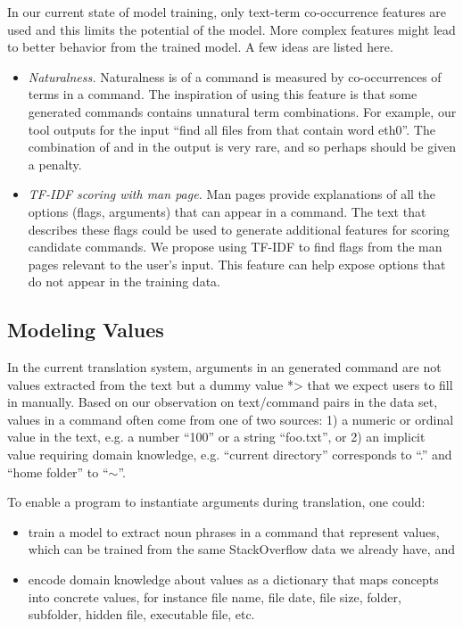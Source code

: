 In our current state of model training, only text-term co-occurrence features are used and this limits the potential of the model. More complex features might lead to better behavior from the trained model. A few ideas are listed here.
\begin{itemize}\itemsep-1pt
\item \textit{Naturalness.} Naturalness is of a command is measured by co-occurrences of terms in a command. The inspiration of using this feature is that some generated commands contains unnatural term combinations. For example, our tool outputs  for the input ``find all files from that contain word eth0''. The combination of  and  in the output is very rare, and so perhaps should be given a penalty.
\item \textit{TF-IDF scoring with man page.} Man pages provide explanations of all the options (flags, arguments) that can appear in a command. The text that describes these flags could be used to generate additional features for scoring candidate commands. We propose using TF-IDF to find flags from the man pages relevant to the user's input. This feature can help expose options that do not appear in the training data.
\end{itemize}

\subsection{Modeling Values}
\label{future:semantics}

In the current translation system, arguments in an generated command are not values extracted from the text but a dummy value \<*> that we expect users to fill in manually. Based on our observation on text/command pairs in the data set, values in a command often come from one of two sources: 1) a numeric or ordinal value in the text, e.g. a number ``100'' or a string ``foo.txt'', or 2) an implicit value requiring domain knowledge, e.g. ``current directory'' corresponds to ``.'' and ``home folder'' to ``$\sim$''.

To enable a program to instantiate arguments during translation, one could:
\begin{itemize}\itemsep-1pt
\item train a model to extract noun phrases in a command that represent values, which can be trained from the same StackOverflow data we already have, and
\item encode domain knowledge about values as a dictionary that maps concepts into concrete values, for instance file name, file date, file size, folder, subfolder, hidden file, executable file, etc.
\end{itemize}

